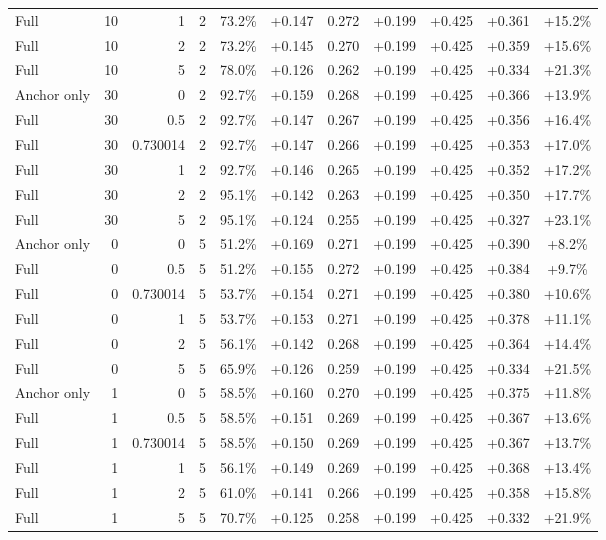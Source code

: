 \begin{table}[htbp]
\begin{tabular}{lrrrccccccc}
Full & 10 & 1 & 2 & 73.2\% & +0.147 & 0.272 & +0.199 & +0.425 & +0.361 & +15.2\% \\
Full & 10 & 2 & 2 & 73.2\% & +0.145 & 0.270 & +0.199 & +0.425 & +0.359 & +15.6\% \\
Full & 10 & 5 & 2 & 78.0\% & +0.126 & 0.262 & +0.199 & +0.425 & +0.334 & +21.3\% \\
Anchor only & 30 & 0 & 2 & 92.7\% & +0.159 & 0.268 & +0.199 & +0.425 & +0.366 & +13.9\% \\
Full & 30 & 0.5 & 2 & 92.7\% & +0.147 & 0.267 & +0.199 & +0.425 & +0.356 & +16.4\% \\
Full & 30 & 0.730014 & 2 & 92.7\% & +0.147 & 0.266 & +0.199 & +0.425 & +0.353 & +17.0\% \\
Full & 30 & 1 & 2 & 92.7\% & +0.146 & 0.265 & +0.199 & +0.425 & +0.352 & +17.2\% \\
Full & 30 & 2 & 2 & 95.1\% & +0.142 & 0.263 & +0.199 & +0.425 & +0.350 & +17.7\% \\
Full & 30 & 5 & 2 & 95.1\% & +0.124 & 0.255 & +0.199 & +0.425 & +0.327 & +23.1\% \\
Anchor only & 0 & 0 & 5 & 51.2\% & +0.169 & 0.271 & +0.199 & +0.425 & +0.390 & +8.2\% \\
Full & 0 & 0.5 & 5 & 51.2\% & +0.155 & 0.272 & +0.199 & +0.425 & +0.384 & +9.7\% \\
Full & 0 & 0.730014 & 5 & 53.7\% & +0.154 & 0.271 & +0.199 & +0.425 & +0.380 & +10.6\% \\
Full & 0 & 1 & 5 & 53.7\% & +0.153 & 0.271 & +0.199 & +0.425 & +0.378 & +11.1\% \\
Full & 0 & 2 & 5 & 56.1\% & +0.142 & 0.268 & +0.199 & +0.425 & +0.364 & +14.4\% \\
Full & 0 & 5 & 5 & 65.9\% & +0.126 & 0.259 & +0.199 & +0.425 & +0.334 & +21.5\% \\
Anchor only & 1 & 0 & 5 & 58.5\% & +0.160 & 0.270 & +0.199 & +0.425 & +0.375 & +11.8\% \\
Full & 1 & 0.5 & 5 & 58.5\% & +0.151 & 0.269 & +0.199 & +0.425 & +0.367 & +13.6\% \\
Full & 1 & 0.730014 & 5 & 58.5\% & +0.150 & 0.269 & +0.199 & +0.425 & +0.367 & +13.7\% \\
Full & 1 & 1 & 5 & 56.1\% & +0.149 & 0.269 & +0.199 & +0.425 & +0.368 & +13.4\% \\
Full & 1 & 2 & 5 & 61.0\% & +0.141 & 0.266 & +0.199 & +0.425 & +0.358 & +15.8\% \\
Full & 1 & 5 & 5 & 70.7\% & +0.125 & 0.258 & +0.199 & +0.425 & +0.332 & +21.9\% \\

\end{tabular}
\end{table}
